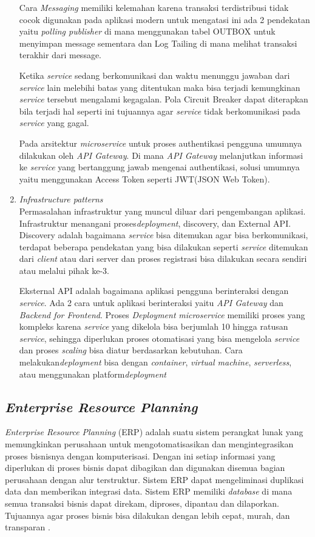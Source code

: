 \begin{enumerate}[leftmargin=1.3cm]
	Cara \textit{Messaging} memiliki kelemahan karena transaksi terdistribusi tidak cocok digunakan pada aplikasi modern untuk mengatasi ini ada 2 pendekatan yaitu \textit{polling publisher} di mana menggunakan tabel OUTBOX untuk menyimpan message sementara dan Log Tailing di mana melihat transaksi terakhir dari message.

	Ketika \textit{service} sedang berkomunikasi dan waktu menunggu jawaban dari \textit{service} lain melebihi batas yang ditentukan maka bisa terjadi kemungkinan \textit{service} tersebut mengalami kegagalan. Pola Circuit Breaker dapat diterapkan bila terjadi hal seperti ini tujuannya agar \textit{service} tidak berkomunikasi pada \textit{service} yang gagal.

	Pada arsitektur \textit{microservice} untuk proses authentikasi pengguna umumnya dilakukan oleh \textit{API Gateway}. Di mana \textit{API Gateway} melanjutkan informasi ke \textit{service} yang bertanggung jawab mengenai authentikasi, solusi umumnya yaitu menggunakan Access Token seperti JWT(JSON Web Token).
	\item \textit{Infrastructure patterns}\\
	Permasalahan infrastruktur yang muncul diluar dari pengembangan aplikasi. Infrastruktur menangani proses\textit{deployment}, discovery, dan External API. 
	Discovery adalah bagaimana \textit{service} bisa ditemukan agar bisa berkomunikasi, terdapat beberapa pendekatan yang bisa dilakukan seperti \textit{service} ditemukan dari \textit{client} atau dari server dan proses registrasi bisa dilakukan secara sendiri atau melalui pihak ke-3.

	Eksternal API adalah bagaimana aplikasi pengguna berinteraksi dengan \textit{service}.
	Ada 2 cara untuk aplikasi berinteraksi yaitu \textit{API Gateway} dan \textit{Backend for Frontend}. Proses \textit{Deployment} \textit{microservice} memiliki proses yang kompleks karena \textit{service} yang dikelola bisa berjumlah 10 hingga ratusan \textit{service}, sehingga diperlukan proses otomatisasi yang bisa mengelola \textit{service} dan proses \textit{scaling} bisa diatur berdasarkan kebutuhan. Cara melakukan\textit{deployment} bisa dengan \textit{container}, \textit{virtual machine}, \textit{serverless}, atau menggunakan platform\textit{deployment} \\	
\end{enumerate}	

\subsection{\textit{Enterprise Resource Planning}}
\textit{Enterprise Resource Planning} (ERP) adalah suatu sistem perangkat lunak yang memungkinkan perusahaan untuk mengotomatisasikan dan mengintegrasikan proses bisnisnya dengan komputerisasi. Dengan ini setiap informasi yang diperlukan di proses bisnis dapat dibagikan dan digunakan disemua bagian perusahaan dengan alur terstruktur. Sistem ERP dapat mengeliminasi duplikasi data dan memberikan integrasi data. Sistem ERP memiliki \textit{database} di mana semua transaksi bisnis dapat direkam, diproses, dipantau dan dilaporkan. Tujuannya agar proses bisnis bisa dilakukan dengan lebih cepat, murah, dan transparan \cite{D94}.

